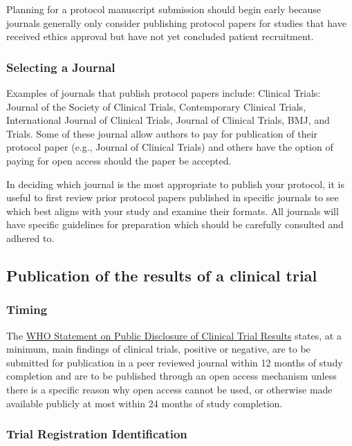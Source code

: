 \documentclass[]{book}
\begin{document}
Planning for a protocol manuscript submission should begin early because
journals generally only consider publishing protocol papers for studies
that have received ethics approval but have not yet concluded patient
recruitment.

\subsubsection{Selecting a Journal}\label{selecting-a-journal}

Examples of journals that publish protocol papers include: Clinical
Trials: Journal of the Society of Clinical Trials, Contemporary Clinical
Trials, International Journal of Clinical Trials, Journal of Clinical
Trials, BMJ, and Trials. Some of these journal allow authors to pay for
publication of their protocol paper (e.g., Journal of Clinical Trials)
and others have the option of paying for open access should the paper be
accepted.

In deciding which journal is the most appropriate to publish your
protocol, it is useful to first review prior protocol papers published
in specific journals to see which best aligns with your study and
examine their formats. All journals will have specific guidelines for
preparation which should be carefully consulted and adhered to.

\subsection{Publication of the results of a clinical
trial}\label{publication-of-the-results-of-a-clinical-trial}

\subsubsection{Timing}\label{timing}

The \href{http://www.who.int/ictrp/results/reporting/en/}{WHO Statement
on Public Disclosure of Clinical Trial Results} states, at a minimum,
main findings of clinical trials, positive or negative, are to be
submitted for publication in a peer reviewed journal within 12 months of
study completion and are to be published through an open access
mechanism unless there is a specific reason why open access cannot be
used, or otherwise made available publicly at most within 24 months of
study completion.

\subsubsection{Trial Registration
Identification}\label{trial-registration-identification}
\end{document}
